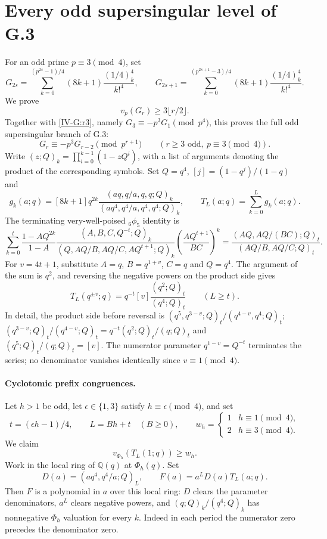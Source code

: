 \documentclass[11pt,letterpaper]{article}
\numberwithin{equation}{section}
\begin{document}
\section{Every odd supersingular level of G.3}\label{loc-IV-6}
\label{IV-sec:G-all}
For an odd prime $p\equiv3\pmod4$, set
\[
G_{2s}=\sum_{k=0}^{(p^{2s}-1)/4}(8k+1)\frac{(1/4)_k^4}{k!^4},\qquad
G_{2s+1}=\sum_{k=0}^{(p^{2s+1}-3)/4}(8k+1)\frac{(1/4)_k^4}{k!^4}.
\]
We prove
\begin{equation}\label{IV-G:all-valuation}
v_p(G_r)\ge3\lfloor r/2\rfloor.
\end{equation}
Together with \eqref{IV-G:r3}, namely
$G_3\equiv-p^3G_1\pmod{p^4}$, this proves the full odd supersingular
branch of G.3:
\begin{equation}\label{IV-G:all-odd}
G_r\equiv-p^3G_{r-2}\pmod{p^{r+1}}
\qquad(r\ge3\text{ odd},\ p\equiv3\pmod4).
\end{equation}
Write $(z;Q)_k=\prod_{i=0}^{k-1}(1-zQ^i)$, with a list of
arguments denoting the product of the corresponding symbols.
Set $Q=q^4$, $[j]=(1-q^j)/(1-q)$ and
\[
g_k(a;q)=[8k+1]q^{2k}
 \frac{(aq,q/a,q,q;Q)_k}{(aq^4,q^4/a,q^4,q^4;Q)_k},
\qquad T_L(a;q)=\sum_{k=0}^L g_k(a;q).
\]
The terminating very-well-poised ${}_6\phi_5$ identity is
\[
\sum_{k=0}^{t}\frac{1-AQ^{2k}}{1-A}
\frac{(A,B,C,Q^{-t};Q)_k}
{(Q,AQ/B,AQ/C,AQ^{t+1};Q)_k}
\left(\frac{AQ^{t+1}}{BC}\right)^k
=\frac{(AQ,AQ/(BC);Q)_t}{(AQ/B,AQ/C;Q)_t}.
\]
For $v=4t+1$, substitute $A=q$, $B=q^{1+v}$, $C=q$ and
$Q=q^4$. The argument of the sum is $q^2$, and reversing the
negative powers on the product side gives
\begin{equation}\label{IV-G:q-Jackson}
T_L(q^{\pm v};q)=q^{-t}[v]\frac{(q^2;Q)_t}{(q^4;Q)_t}
\qquad(L\ge t).
\end{equation}
In detail, the product side before reversal is
$(q^5,q^{3-v};Q)_t/(q^{4-v},q^4;Q)_t$;
$(q^{3-v};Q)_t/(q^{4-v};Q)_t
=q^{-t}(q^2;Q)_t/(q;Q)_t$ and
$(q^5;Q)_t/(q;Q)_t=[v]$.
The numerator parameter $q^{1-v}=Q^{-t}$ terminates the series;
no denominator vanishes identically since $v\equiv1\pmod4$.

\paragraph{Cyclotomic prefix congruences.}
Let $h>1$ be odd, let $\epsilon\in\{1,3\}$ satisfy
$h\equiv\epsilon\pmod4$, and set
\[
t=(\epsilon h-1)/4,\qquad L=Bh+t\quad(B\ge0),\qquad
w_h=\begin{cases}1&h\equiv1\pmod4,\\2&h\equiv3\pmod4.\end{cases}
\]
We claim
\begin{equation}\label{IV-G:prefix}
v_{\Phi_h}(T_L(1;q))\ge w_h.
\end{equation}
Work in the local ring of $\mathbb Q(q)$ at $\Phi_h(q)$.
Set
\[
D(a)=(aq^4,q^4/a;Q)_L,\qquad F(a)=a^LD(a)T_L(a;q).
\]
Then $F$ is a polynomial in $a$ over this local ring: $D$ clears
the parameter denominators, $a^L$ clears negative powers, and
$(q;Q)_k/(q^4;Q)_k$ has nonnegative $\Phi_h$ valuation for every
$k$. Indeed in each period the numerator zero precedes the
denominator zero.
\end{document}
